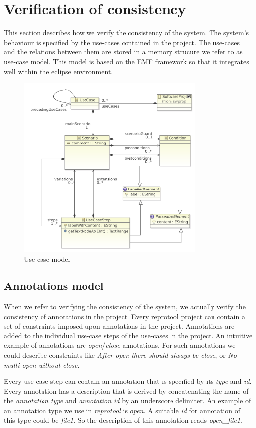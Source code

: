 \section{Verification of consistency}
This section describes how we verify the consistency of the system. The system's behaviour is specified by the use-cases contained
in the project. The use-cases and the relations between them are stored in a memory strucure we refer to as use-case model.
This model is based on the EMF framework so that it integrates well within the eclipse environment.

\begin{figure}[ht]
  \centering
  \includegraphics[width=260pt]{images/ReprotoolUCModel}
  \caption{Use-case model}
  \label{fig:ReprotoolUCModel}
\end{figure}

\subsection{Annotations model}

When we refer to verifying the consistency of the system, we actually verify the consistency of annotations in the project. Every
reprotool project can contain a set of constraints imposed upon annotations in the project. Annotations are added to the individual
use-case steps of the use-cases in the project. An intuitive example of annotations are \emph{open}/\emph{close}
annotations. For such annotations we could describe constraints like \emph{After open there should always be close}, or \emph
{No multi open without close}.

Every use-case step can contain an annotation that is specified by its \emph{type} and \emph{id}. Every annotation has a description
that is derived by concatenating the name of the \emph{annotation type} and \emph{annotation id} by an underscore delimiter.
An example of an annotation type we use in \emph{reprotool} is \emph{open}. A suitable \emph{id} for annotation of this type could be
\emph{file1}. So the description of this annotation reads \emph{open\_file1}.

